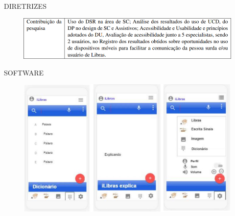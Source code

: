 \documentclass{Alexandre}
\begin{document}
\begin{frame}{DIRETRIZES}
    
    \begin{figure}
        \includegraphics[scale = 0.5]{Figuras/DSR-6.png}
    \end{figure}

\end{frame}


\begin{frame}{SOFTWARE}
    
    \begin{figure}
        \includegraphics[scale = 0.3]{Figuras/Aplicativo.jpg}
    \end{figure}

\end{frame}
\end{document}
